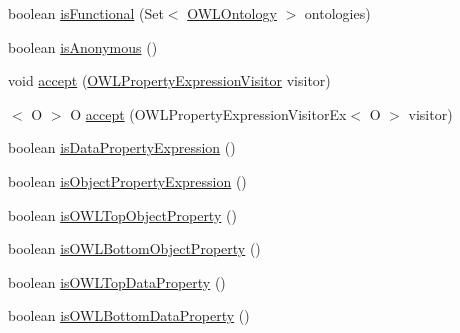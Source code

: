 \begin{DoxyCompactItemize}
\item 
boolean \hyperlink{interfaceorg_1_1semanticweb_1_1owlapi_1_1model_1_1_o_w_l_property_expression_3_01_r_01extends_0189559738b26c5864733719a0227d2300_abbfb6cff655b7664f4328980546ac904}{is\-Functional} (Set$<$ \hyperlink{interfaceorg_1_1semanticweb_1_1owlapi_1_1model_1_1_o_w_l_ontology}{O\-W\-L\-Ontology} $>$ ontologies)
\item 
boolean \hyperlink{interfaceorg_1_1semanticweb_1_1owlapi_1_1model_1_1_o_w_l_property_expression_3_01_r_01extends_0189559738b26c5864733719a0227d2300_a158399619332a1341577dc9c9ab3930c}{is\-Anonymous} ()
\item 
void \hyperlink{interfaceorg_1_1semanticweb_1_1owlapi_1_1model_1_1_o_w_l_property_expression_3_01_r_01extends_0189559738b26c5864733719a0227d2300_a060b0e7433d152722b08898765ed7e42}{accept} (\hyperlink{interfaceorg_1_1semanticweb_1_1owlapi_1_1model_1_1_o_w_l_property_expression_visitor}{O\-W\-L\-Property\-Expression\-Visitor} visitor)
\item 
$<$ O $>$ O \hyperlink{interfaceorg_1_1semanticweb_1_1owlapi_1_1model_1_1_o_w_l_property_expression_3_01_r_01extends_0189559738b26c5864733719a0227d2300_af023056e131245cc15f072b9c0132e85}{accept} (O\-W\-L\-Property\-Expression\-Visitor\-Ex$<$ O $>$ visitor)
\item 
boolean \hyperlink{interfaceorg_1_1semanticweb_1_1owlapi_1_1model_1_1_o_w_l_property_expression_3_01_r_01extends_0189559738b26c5864733719a0227d2300_a59cba60e8644ec6e210bf4da7a829c5d}{is\-Data\-Property\-Expression} ()
\item 
boolean \hyperlink{interfaceorg_1_1semanticweb_1_1owlapi_1_1model_1_1_o_w_l_property_expression_3_01_r_01extends_0189559738b26c5864733719a0227d2300_ada306856d2c57b9ce4bb74ed90f92274}{is\-Object\-Property\-Expression} ()
\item 
boolean \hyperlink{interfaceorg_1_1semanticweb_1_1owlapi_1_1model_1_1_o_w_l_property_expression_3_01_r_01extends_0189559738b26c5864733719a0227d2300_a68bcd8dc804e4ad3d8f6293f3f7b3b4e}{is\-O\-W\-L\-Top\-Object\-Property} ()
\item 
boolean \hyperlink{interfaceorg_1_1semanticweb_1_1owlapi_1_1model_1_1_o_w_l_property_expression_3_01_r_01extends_0189559738b26c5864733719a0227d2300_aac06f1d9c74f11a80ebaedf0351cff86}{is\-O\-W\-L\-Bottom\-Object\-Property} ()
\item 
boolean \hyperlink{interfaceorg_1_1semanticweb_1_1owlapi_1_1model_1_1_o_w_l_property_expression_3_01_r_01extends_0189559738b26c5864733719a0227d2300_a6f3c325307334a5c895b0514a5b7a780}{is\-O\-W\-L\-Top\-Data\-Property} ()
\item 
boolean \hyperlink{interfaceorg_1_1semanticweb_1_1owlapi_1_1model_1_1_o_w_l_property_expression_3_01_r_01extends_0189559738b26c5864733719a0227d2300_a68a18a9a53a73ad3d62bf773e9c39842}{is\-O\-W\-L\-Bottom\-Data\-Property} ()
\end{DoxyCompactItemize}


